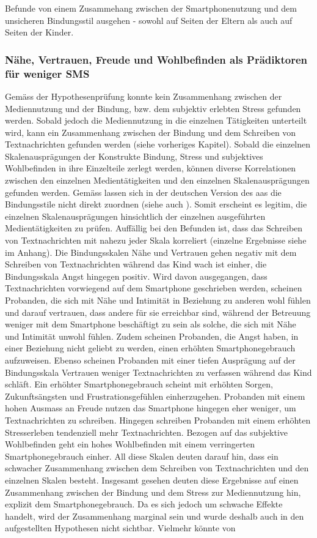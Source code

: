 Befunde von einem Zusammehang zwischen der Smartphonenutzung und dem unsicheren Bindungsstil ausgehen - sowohl auf Seiten der Eltern als auch auf Seiten der Kinder.

\subsubsection{Nähe, Vertrauen, Freude und Wohlbefinden als Prädiktoren für weniger SMS}
Gemäss der Hypothesenprüfung konnte kein Zusammenhang zwischen der Mediennutzung und der Bindung, bzw. dem subjektiv erlebten Stress gefunden werden. Sobald jedoch die Mediennutzung in die einzelnen Tätigkeiten unterteilt wird, kann ein Zusammenhang zwischen der Bindung und dem Schreiben von Textnachrichten gefunden werden (siehe vorheriges Kapitel). Sobald die einzelnen Skalenausprägungen der Konstrukte Bindung, Stress und subjektives Wohlbefinden in ihre Einzelteile zerlegt werden, können diverse Korrelationen zwischen den einzelnen Medientätigkeiten und den einzelnen Skalenausprägungen gefunden werden. Gemäss  lassen sich in der deutschen Version des \acrshort{aas} die Bindungsstile nicht direkt zuordnen (siehe auch \textit{}). Somit erscheint es legitim, die einzelnen Skalenausprägungen hinsichtlich der einzelnen ausgeführten Medientätigkeiten zu prüfen. Auffällig bei den Befunden ist, dass das Schreiben von Textnachrichten mit nahezu jeder Skala korreliert (einzelne Ergebnisse siehe  im Anhang). Die Bindungsskalen Nähe und Vertrauen gehen negativ mit dem Schreiben von Textnachrichten während das Kind wach ist einher, die Bindungsskala Angst hingegen positiv. Wird davon ausgegangen, dass Textnachrichten vorwiegend auf dem Smartphone geschrieben werden, scheinen Probanden, die sich mit Nähe und Intimität in Beziehung zu anderen wohl fühlen und darauf vertrauen, dass andere für sie erreichbar sind, während der Betreuung weniger mit dem Smartphone beschäftigt zu sein als solche, die sich mit Nähe und Intimität unwohl fühlen. Zudem scheinen Probanden, die Angst haben, in einer Beziehung nicht geliebt zu werden, einen erhöhten Smartphonegebrauch aufzuweisen. Ebenso scheinen Probanden mit einer tiefen Ausprägung auf der Bindungsskala Vertrauen weniger Textnachrichten zu verfassen während das Kind schläft. Ein erhöhter Smartphonegebrauch scheint mit erhöhten Sorgen, Zukunftsängsten und Frustrationsgefühlen einherzugehen. Probanden mit einem hohen Ausmass an Freude nutzen das Smartphone hingegen eher weniger, um Textnachrichten zu schreiben. Hingegen schreiben Probanden mit einem erhöhten Stresserleben tendenziell mehr Textnachrichten. Bezogen auf das subjektive Wohlbefinden geht ein hohes Wohlbefinden mit einem verringerten Smartphonegebrauch einher. All diese Skalen deuten darauf hin, dass ein schwacher Zusammenhang zwischen dem Schreiben von Textnachrichten und den einzelnen Skalen besteht. Insgesamt gesehen deuten diese Ergebnisse auf einen Zusammenhang zwischen der Bindung und dem Stress zur Mediennutzung hin, explizit dem Smartphonegebrauch. Da es sich jedoch um schwache Effekte handelt, wird der Zusammenhang marginal sein und wurde deshalb auch in den aufgestellten Hypothesen nicht sichtbar. Vielmehr könnte von 